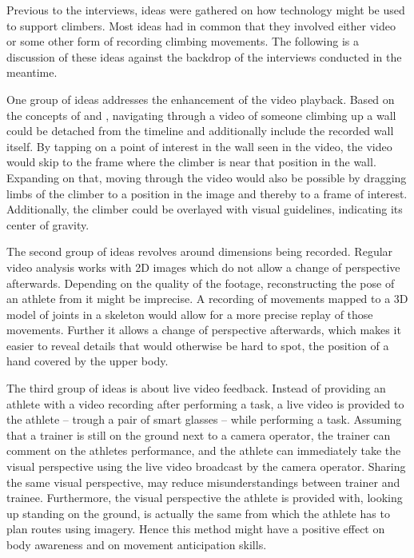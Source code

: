 Previous to the interviews, ideas were gathered on how technology might be used to support climbers. Most ideas had in common that they involved either video or some other form of recording climbing movements. The following is a discussion of these ideas against the backdrop of the interviews conducted in the meantime. 

One group of ideas addresses the enhancement of the video playback. Based on the concepts of \textcite{Goldman:2008:VOA:1449715.1449719} and \textcite{Dragicevic:2008:VBD:1357054.1357096}, navigating through a video of someone climbing up a wall could be detached from the timeline and additionally include the recorded wall itself. By tapping on a point of interest in the wall seen in the video, the video would skip to the frame where the climber is near that position in the wall. Expanding on that, moving through the video would also be possible by dragging limbs of the climber to a position in the image and thereby to a frame of interest. Additionally, the climber could be overlayed with visual guidelines, \eg indicating its center of gravity.

The second group of ideas revolves around dimensions being recorded. Regular video analysis works with 2D images which do not allow a change of perspective afterwards. Depending on the quality of the footage, reconstructing the pose of an athlete from it might be imprecise. A recording of movements mapped to a 3D model of joints in a skeleton would allow for a more precise replay of those movements. Further it allows a change of perspective afterwards, which makes it easier to reveal details that would otherwise be hard to spot, \eg the position of a hand covered by the upper body.

The third group of ideas is about live video feedback. Instead of providing an athlete with a video recording after performing a task, a live video is provided to the athlete -- trough a pair of smart glasses -- while performing a task. Assuming that a trainer is still on the ground next to a camera operator, the trainer can comment on the athletes performance, and the athlete can immediately take the visual perspective using the live video broadcast by the camera operator. Sharing the same visual perspective, may reduce misunderstandings between trainer and trainee. Furthermore, the visual perspective the athlete is provided with, looking up standing on the ground, is actually the same from which the athlete has to plan routes using imagery. Hence this method might have a positive effect on body awareness and on movement anticipation skills.

